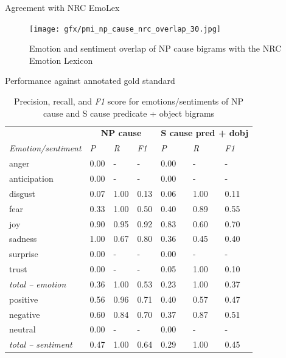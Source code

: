 \documentclass[11pt]{beamer}
\begin{document}
\begin{frame}{Agreement with NRC EmoLex}

\begin{figure}[bth]
\texttt{[image: gfx/pmi\_np\_cause\_nrc\_overlap\_30.jpg]}
\caption{Emotion and sentiment overlap of NP cause bigrams with the NRC Emotion Lexicon}\label{fig:pmi-np-cause-nrc-overlap}
\end{figure}

\end{frame}

\begin{frame}{Performance against annotated gold standard}
\begin{table}[]
\centering
\begin{tabular}{l|lll|lll}
\multicolumn{1}{c}{{\bf }} & \multicolumn{3}{c}{{\bf NP cause}} & \multicolumn{3}{c}{{\bf S cause pred + dobj}} \\
{\it Emotion/sentiment} & {\it P} & {\it R} & {\it F1} & {\it P} & {\it R} & {\it F1} \\\hline
anger & 0.00 & - & - & 0.00 & - & - \\
anticipation & 0.00 & - & - & 0.00 & - & - \\
disgust & 0.07 & 1.00 & 0.13 & 0.06 & 1.00 & 0.11\\
fear & 0.33 & 1.00 & 0.50 & 0.40 & 0.89 & 0.55\\
joy & 0.90 & 0.95 & 0.92 & 0.83 & 0.60 & 0.70\\
sadness & 1.00 & 0.67 & 0.80 & 0.36 & 0.45 & 0.40\\
surprise & 0.00 & - & - & 0.00 & - & - \\
trust & 0.00 & - & - & 0.05 & 1.00 & 0.10 \\\hline
\textit{total -- emotion} & 0.36 & 1.00 & 0.53 & 0.23 & 1.00 & 0.37\\\hline
positive & 0.56 & 0.96 & 0.71 & 0.40 & 0.57 & 0.47\\
negative & 0.60 & 0.84 & 0.70 & 0.37 & 0.87 & 0.51\\
neutral & 0.00 & - & - & 0.00 & - & - \\\hline
\textit{total -- sentiment} & 0.47 & 1.00 & 0.64 & 0.29 & 1.00 & 0.45
\end{tabular}
\caption{Precision, recall, and \textit{F1} score for emotions/sentiments of NP cause and S cause predicate + object bigrams}
\label{tab:bigrams-precision-against-annotation}
\end{table}
\end{frame}
\end{document}

